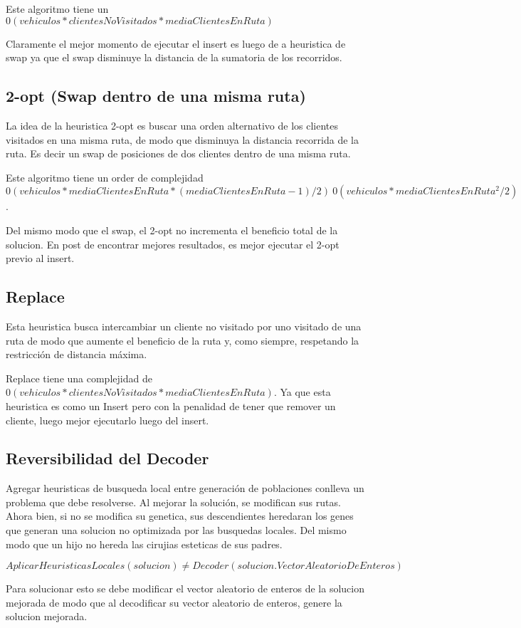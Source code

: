 \bigskip

Este algoritmo tiene un $0(vehiculos * clientesNoVisitados * mediaClientesEnRuta)$

\bigskip

Claramente el mejor momento de ejecutar el insert es luego de a heuristica de swap ya que el swap disminuye la distancia de la sumatoria de los recorridos.

\subsection{2-opt (Swap dentro de una misma ruta)}

La idea de la heuristica 2-opt es buscar una orden alternativo de los clientes visitados en una misma ruta, de modo que disminuya la distancia recorrida de la ruta. Es decir un swap de posiciones de dos clientes dentro de una misma ruta.

\bigskip

Este algoritmo tiene un order de complejidad $0(vehiculos * mediaClientesEnRuta  * (mediaClientesEnRuta - 1) / 2) ~ 0 (vehiculos * mediaClientesEnRuta^2 / 2)$.

\bigskip

Del mismo modo que el swap, el 2-opt no incrementa el beneficio total de la solucion. En post de encontrar mejores resultados, es mejor ejecutar el 2-opt previo al insert.

\subsection{Replace}

Esta heuristica busca intercambiar un cliente no visitado por uno visitado de una ruta de modo que aumente el beneficio de la ruta y, como siempre, respetando la restricción de distancia máxima.

\bigskip

Replace tiene una complejidad de $0(vehiculos * clientesNoVisitados * mediaClientesEnRuta)$. Ya que esta heuristica es como un Insert pero con la penalidad de tener que remover un cliente, luego mejor ejecutarlo luego del insert.

\subsection{Reversibilidad del Decoder}

Agregar heuristicas de busqueda local entre generación de poblaciones conlleva un problema que debe resolverse. Al mejorar la solución, se modifican sus rutas. Ahora bien, si no se modifica su genetica, sus descendientes heredaran los genes que generan una solucion no optimizada por las busquedas locales. Del mismo modo que un hijo no hereda las cirujias esteticas de sus padres. 

\begin{equation*}
AplicarHeuristicasLocales(solucion) \neq Decoder(solucion.VectorAleatorioDeEnteros)
\end{equation*}

Para solucionar esto se debe modificar el vector aleatorio de enteros de la solucion mejorada de modo que al decodificar su vector aleatorio de enteros, genere la solucion mejorada.
